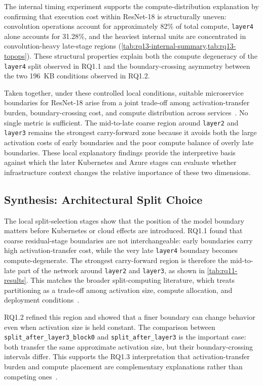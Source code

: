 The internal timing experiment supports the compute-distribution explanation
by confirming that execution cost within ResNet-18 is structurally uneven:
convolution operations account for approximately 82\% of total compute,
\texttt{layer4} alone accounts for 31.28\%, and the heaviest internal units
are concentrated in convolution-heavy late-stage regions
(\cref{tab:rq13-internal-summary,tab:rq13-topops}). These structural
properties explain both the compute degeneracy of the \texttt{layer4} split
observed in RQ1.1 and the boundary-crossing asymmetry between the two 196~KB
conditions observed in RQ1.2.

Taken together, under these controlled local conditions, suitable microservice
boundaries for ResNet-18 arise from a joint trade-off among activation-transfer
burden, boundary-crossing cost, and compute distribution across
services~\cite{neurosurgeon, dnnsplit, jointdnn, deeperthings}. No single
metric is sufficient. The mid-to-late coarse region around \texttt{layer2} and
\texttt{layer3} remains the strongest carry-forward zone because it avoids
both the large activation costs of early boundaries and the poor compute
balance of overly late boundaries. These local explanatory findings provide
the interpretive basis against which the later Kubernetes and Azure stages can
evaluate whether infrastructure context changes the relative importance of
these two dimensions.

\subsection{Synthesis: Architectural Split Choice}
\label{sec:analysis-split-synthesis}

The local split-selection stages show that the position of the model boundary
matters before Kubernetes or cloud effects are introduced. RQ1.1 found that
coarse residual-stage boundaries are not interchangeable: early boundaries
carry high activation-transfer cost, while the very late \texttt{layer4}
boundary becomes compute-degenerate. The strongest carry-forward region is
therefore the mid-to-late part of the network around \texttt{layer2} and
\texttt{layer3}, as shown in \cref{tab:rq11-results}. This matches the broader
split-computing literature, which treats partitioning as a trade-off among
activation size, compute allocation, and deployment
conditions~\cite{neurosurgeon,dnnsplit,deeperthings,survey_partitioning}.

RQ1.2 refined this region and showed that a finer boundary can change behavior
even when activation size is held constant. The comparison between
\texttt{split\_after\_layer3\_block0} and \texttt{split\_after\_layer3} is the
important case: both transfer the same approximate activation size, but their
boundary-crossing intervals differ. This supports the RQ1.3 interpretation
that activation-transfer burden and compute placement are complementary
explanations rather than competing ones~\cite{fine_grained_partitioning,
hierarchical_partitioning,pareto_split}.

